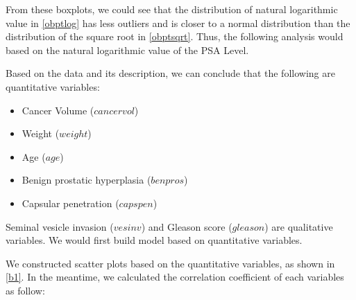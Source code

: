 \documentclass[12pt,letterpaper,titlepage,en-US]{article}
\begin{document}
From these boxplots, we could see that the distribution of natural logarithmic value in \cref{obptlog} has less outliers and is closer to a normal distribution than the distribution of the square root in \cref{obptsqrt}. Thus, the following analysis would based on the natural logarithmic value of the PSA Level.

Based on the data and its description, we can conclude that the following are quantitative variables:
\begin{itemize}
    \item Cancer Volume ($cancervol$)
    \item Weight ($weight$)
    \item Age ($age$)
    \item Benign prostatic hyperplasia ($benpros$)
    \item Capsular penetration ($capspen$)
\end{itemize}
Seminal vesicle invasion ($vesinv$) and Gleason score ($gleason$) are qualitative variables. We would first build model based on quantitative variables.

We constructed scatter plots based on the quantitative variables, as shown in \cref{b1}.
In the meantime, we calculated the correlation coefficient of each variables as follow:
\end{document}
